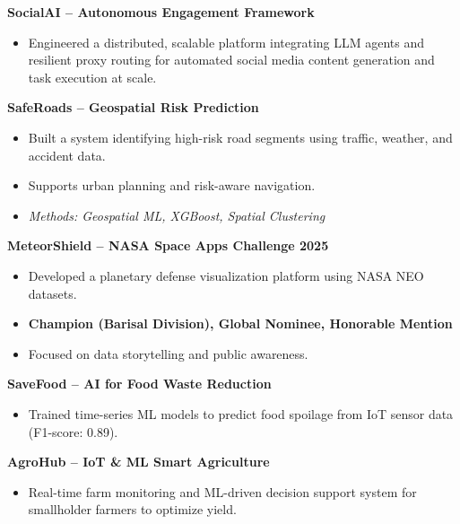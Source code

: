 \documentclass[a4paper,11pt]{article}
\begin{document}
\textbf{SocialAI -- Autonomous Engagement Framework} \\
\begin{itemize}
\vspace{-1.5em}
    \item Engineered a distributed, scalable platform integrating LLM agents and resilient proxy routing for automated social media content generation and task execution at scale.
\end{itemize}

\textbf{SafeRoads -- Geospatial Risk Prediction} \\
\begin{itemize}
\vspace{-1.5em}
    \item Built a system identifying high-risk road segments using traffic, weather, and accident data.
    \item Supports urban planning and risk-aware navigation.
    \item \textit{Methods: Geospatial ML, XGBoost, Spatial Clustering}
\end{itemize}

\textbf{MeteorShield -- NASA Space Apps Challenge 2025} \\
\begin{itemize}
\vspace{-1.5em}
    \item Developed a planetary defense visualization platform using NASA NEO datasets.
    \item \textbf{Champion (Barisal Division), Global Nominee, Honorable Mention}
    \item Focused on data storytelling and public awareness.
\end{itemize}

\textbf{SaveFood -- AI for Food Waste Reduction} \\
\begin{itemize}
\vspace{-1.5em}
    \item Trained time-series ML models to predict food spoilage from IoT sensor data (F1-score: 0.89).
\end{itemize}

\textbf{AgroHub -- IoT \& ML Smart Agriculture} \\
\begin{itemize}
\vspace{-1.5em}
    \item Real-time farm monitoring and ML-driven decision support system for smallholder farmers to optimize yield.
\end{itemize}
\end{document}
